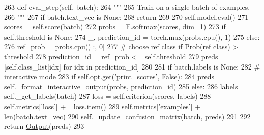 \begin{DoxyCode}
263     \textcolor{keyword}{def }eval\_step(self, batch):
264         \textcolor{stringliteral}{"""}
265 \textcolor{stringliteral}{        Train on a single batch of examples.}
266 \textcolor{stringliteral}{        """}
267         \textcolor{keywordflow}{if} batch.text\_vec \textcolor{keywordflow}{is} \textcolor{keywordtype}{None}:
268             \textcolor{keywordflow}{return}
269 
270         self.model.eval()
271         scores = self.score(batch)
272         probs = F.softmax(scores, dim=1)
273         \textcolor{keywordflow}{if} self.threshold \textcolor{keywordflow}{is} \textcolor{keywordtype}{None}:
274             \_, prediction\_id = torch.max(probs.cpu(), 1)
275         \textcolor{keywordflow}{else}:
276             ref\_prob = probs.cpu()[:, 0]
277             \textcolor{comment}{# choose ref class if Prob(ref class) > threshold}
278             prediction\_id = ref\_prob <= self.threshold
279         preds = [self.class\_list[idx] \textcolor{keywordflow}{for} idx \textcolor{keywordflow}{in} prediction\_id]
280 
281         \textcolor{keywordflow}{if} batch.labels \textcolor{keywordflow}{is} \textcolor{keywordtype}{None}:
282             \textcolor{comment}{# interactive mode}
283             \textcolor{keywordflow}{if} self.opt.get(\textcolor{stringliteral}{'print\_scores'}, \textcolor{keyword}{False}):
284                 preds = self.\_format\_interactive\_output(probs, prediction\_id)
285         \textcolor{keywordflow}{else}:
286             labels = self.\_get\_labels(batch)
287             loss = self.criterion(scores, labels)
288             self.metrics[\textcolor{stringliteral}{'loss'}] += loss.item()
289             self.metrics[\textcolor{stringliteral}{'examples'}] += len(batch.text\_vec)
290             self.\_update\_confusion\_matrix(batch, preds)
291 
292         \textcolor{keywordflow}{return} \hyperlink{namespaceparlai_1_1agents_1_1legacy__agents_1_1seq2seq_1_1torch__agent__v1_a2689006ea97d09413fb242f984bd8016}{Output}(preds)
293 
\end{DoxyCode}
\mbox{\label{classparlai_1_1core_1_1torch__classifier__agent_1_1TorchClassifierAgent_acf3aabdf7a98e434614c4da20c599df2}} 
